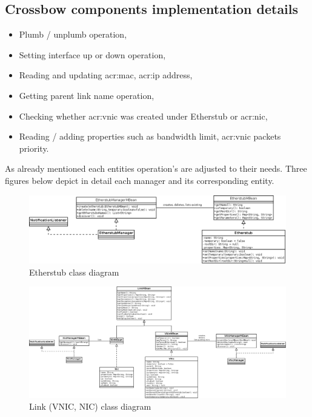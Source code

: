 \documentclass[11pt,openany]{book}
\begin{document}
      \subsection{Crossbow components implementation details}
      \label{sec:impl:comp}

        \begin{itemize}
          \item Plumb / unplumb operation, 
          \item Setting interface up or down operation,
          \item Reading and updating \gls{acr:mac}, \gls{acr:ip} address,
          \item Getting parent link name operation,
          \item Checking whether \gls{acr:vnic} was created under Etherstub or \gls{acr:nic},
          \item Reading / adding properties such as bandwidth limit, \gls{acr:vnic} packets priority.
        \end{itemize}

        As already mentioned each entities operation's are adjusted to their needs. Three figures below  depict in detail each manager and its corresponding entity.


        \begin{figure}[H]
          \centering
          \includegraphics[width=1.2\textwidth, angle=90]{img/impl/etherstub.png}

          \caption{Etherstub class diagram}
        \end{figure}        

        \begin{figure}[H]
          \centering
          \includegraphics[width=1.2\textwidth, angle=90]{img/impl/link.png}

          \caption{Link (VNIC, NIC) class diagram}
        \end{figure}        
\end{document}
